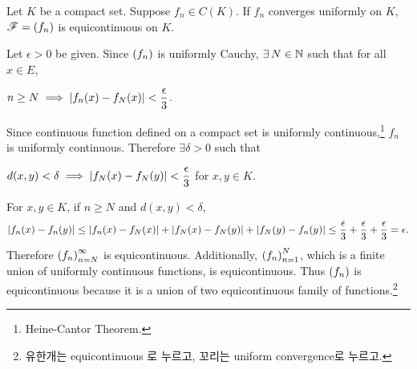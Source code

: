 \medskip

 Let \(K\) be a compact set. Suppose \(f_n \in C(K)\). If \(f_n\) converges uniformly on \(K\), \(\mathscr{F} = \left( f_n \right)\) is equicontinuous on \(K\).

\pf Let \(\epsilon > 0\) be given. Since \(\left( f_n \right)\) is uniformly Cauchy, \(\exists N\in \N\) such that for all \(x \in E\),
\begin{center}
    \(n\geq N \implies \left| f_n(x)  - f_N(x) \right| < \dfrac{\epsilon}{3}\).
\end{center}
Since continuous function defined on a compact set is uniformly continuous,\footnote{Heine-Cantor Theorem.} \(f_n\) is uniformly continuous. Therefore \(\exists \delta > 0\) such that
\begin{center}
    \(d(x, y) < \delta \implies \left| f_N(x) - f_N(y) \right| < \dfrac{\epsilon}{3}\) for \(x, y \in K\).
\end{center}
For \(x, y\in K\), if \(n \geq N\) and \(d(x, y) < \delta\),
\[
    \left| f_n(x) - f_n(y) \right| \leq \left| f_n(x) - f_N(x) \right| + \left| f_N(x) - f_N(y) \right| + \left| f_N(y) - f_n(y) \right| \leq \frac{\epsilon}{3} + \frac{\epsilon}{3} + \frac{\epsilon}{3} = \epsilon.
\]
Therefore \(\left( f_n \right)_{n=N}^\infty\) is equicontinuous. Additionally, \(\left( f_n \right)_{n=1}^N\), which is a finite union of uniformly continuous functions, is equicontinuous. Thus \(\left( f_n \right)\) is equicontinuous because it is a union of two equicontinuous family of functions.\footnote{유한개는 equicontinuous 로 누르고, 꼬리는 uniform convergence로 누르고.}

\pagebreak

